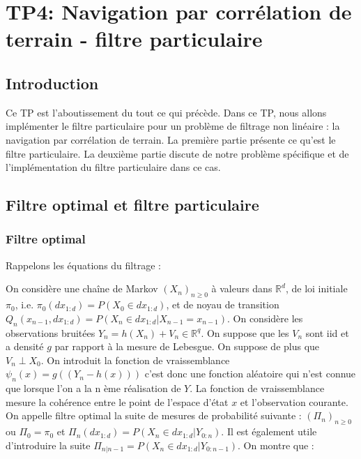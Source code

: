 \documentclass{article}
\begin{document}
\clearpage


\section{TP4: Navigation par corrélation de terrain - filtre particulaire}
\subsection{Introduction}
Ce TP est l'aboutissement du tout ce qui précède. Dans ce TP, nous allons 
implémenter le filtre particulaire pour un problème de filtrage non linéaire : la navigation par corrélation de terrain. 
La première partie présente ce qu'est le filtre particulaire. La deuxième partie discute de 
notre problème spécifique et de l'implémentation du filtre particulaire dans ce cas. 
\subsection{Filtre optimal et filtre particulaire}
\subsubsection{Filtre optimal}
Rappelons les équations du filtrage :

On considère une chaîne de Markov $(X_{n})_{n \geq 0}$ à valeurs dans $\mathbb{R}^d$, de loi initiale $\pi_0$, i.e. $\pi_0(dx_{1:d})=P(X_0 \in dx_{1:d})$, et de noyau de transition 
$Q_{n}(x_{n-1},dx_{1:d})= P(X_n \in dx_{1:d} \vert X_{n-1}=x_{n-1} )$. 
On considère les observations bruitées $Y_n = h(X_n)+ V_n \in \mathbb{R}^q$. On suppose que les 
$V_n$ sont iid et a densité $g$ par rapport à la mesure de Lebesgue. On suppose de plus que $V_n \perp X_0$. On introduit la fonction de vraissemblance  
$\psi_n(x)=g((Y_n-h(x)))$ c'est donc une fonction aléatoire qui n'est connue que lorsque l'on a la n ème réalisation de $Y$. La fonction de vraissemblance mesure la cohérence entre le point de l'espace d'état $x$
et l'observation courante. \\
On appelle filtre optimal la suite de mesures de probabilité suivante : $(\Pi_n)_{n \geq 0}$ ou $\Pi_0 = \pi_0$ et $\Pi_n(dx_{1:d})= P(X_n \in dx_{1:d} \vert Y_{0:n})$. Il est également utile d'introduire la suite 
$\Pi_{n \vert n-1} = P(X_n \in dx_{1:d} \vert Y_{0:n-1})$. 
On montre que : 
\end{document}

